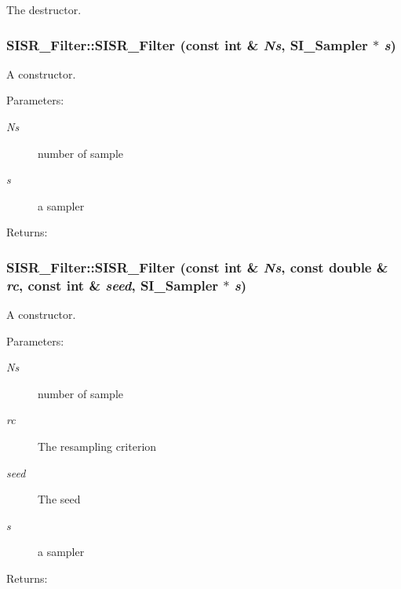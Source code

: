 The destructor. 

\hypertarget{class_s_i_s_r___filter_ee8aaf7607b94e836bf5a8227b741e83}{
\subsubsection[{SISR\_\-Filter}]{\setlength{\rightskip}{0pt plus 5cm}SISR\_\-Filter::SISR\_\-Filter (const int \& {\em Ns}, \/  {\bf SI\_\-Sampler} $\ast$ {\em s})}}
\label{class_s_i_s_r___filter_ee8aaf7607b94e836bf5a8227b741e83}


A constructor. 

\begin{Desc}
\item[Parameters:]
\begin{description}
\item[{\em Ns}]number of sample \item[{\em s}]a sampler\end{description}
\end{Desc}
\begin{Desc}
\item[Returns:]\end{Desc}
\hypertarget{class_s_i_s_r___filter_ac330d4b6001a394af4beb4ee46b1909}{
\subsubsection[{SISR\_\-Filter}]{\setlength{\rightskip}{0pt plus 5cm}SISR\_\-Filter::SISR\_\-Filter (const int \& {\em Ns}, \/  const double \& {\em rc}, \/  const int \& {\em seed}, \/  {\bf SI\_\-Sampler} $\ast$ {\em s})}}
\label{class_s_i_s_r___filter_ac330d4b6001a394af4beb4ee46b1909}


A constructor. 

\begin{Desc}
\item[Parameters:]
\begin{description}
\item[{\em Ns}]number of sample \item[{\em rc}]The resampling criterion \item[{\em seed}]The seed \item[{\em s}]a sampler\end{description}
\end{Desc}
\begin{Desc}
\item[Returns:]\end{Desc}



